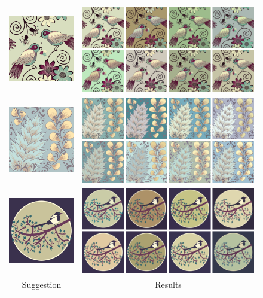 \begin{figure}[ht]
\begin{tabular}{cc}
\includegraphics[width=.22\columnwidth]{figs/guidedSearch0Original}&\includegraphics[width=.7\columnwidth]{figs/guidedSearch0MMR}\vspace{0.5em}\\
\includegraphics[width=.22\columnwidth]{figs/guidedSearch1Original}&\includegraphics[width=.7\columnwidth]{figs/guidedSearch1MMR}\\
\includegraphics[width=.22\columnwidth]{figs/guidedSearch2Original}&\includegraphics[width=.7\columnwidth]{figs/guidedSearch2MMR}\\
Suggestion&Results\\
\end{tabular}


\end{figure}
